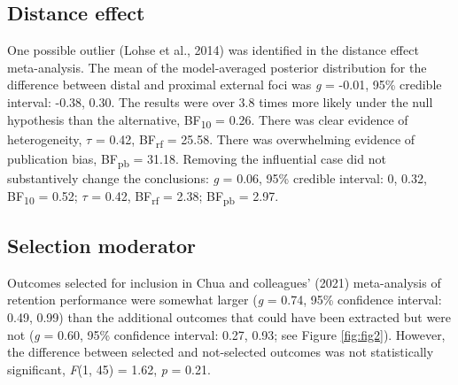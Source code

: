 \documentclass[
  man, donotrepeattitle,floatsintext]{apa7}
\begin{document}
\hypertarget{distance-effect}{%
\subsection{Distance effect}\label{distance-effect}}

One possible outlier (Lohse et al., 2014) was identified in the distance effect meta-analysis. The mean of the model-averaged posterior distribution for the difference between distal and proximal external foci was \emph{g} = -0.01, 95\% credible interval: -0.38, 0.30. The results were over 3.8 times more likely under the null hypothesis than the alternative, BF\textsubscript{10} = 0.26. There was clear evidence of heterogeneity, \(\tau\) = 0.42, BF\textsubscript{rf} = 25.58. There was overwhelming evidence of publication bias, BF\textsubscript{pb} = 31.18. Removing the influential case did not substantively change the conclusions: \emph{g} = 0.06, 95\% credible interval: 0, 0.32, BF\textsubscript{10} = 0.52; \(\tau\) = 0.42, BF\textsubscript{rf} = 2.38; BF\textsubscript{pb} = 2.97.

\hypertarget{selection-moderator}{%
\subsection{Selection moderator}\label{selection-moderator}}

Outcomes selected for inclusion in Chua and colleagues' (2021) meta-analysis of retention performance were somewhat larger (\emph{g} = 0.74, 95\% confidence interval: 0.49, 0.99) than the additional outcomes that could have been extracted but were not (\emph{g} = 0.60, 95\% confidence interval: 0.27, 0.93; see Figure \ref{fig:fig2}). However, the difference between selected and not-selected outcomes was not statistically significant, \emph{F}(1, 45) = 1.62, \emph{p} = 0.21.

\clearpage
\vspace{-3em}
\end{document}
